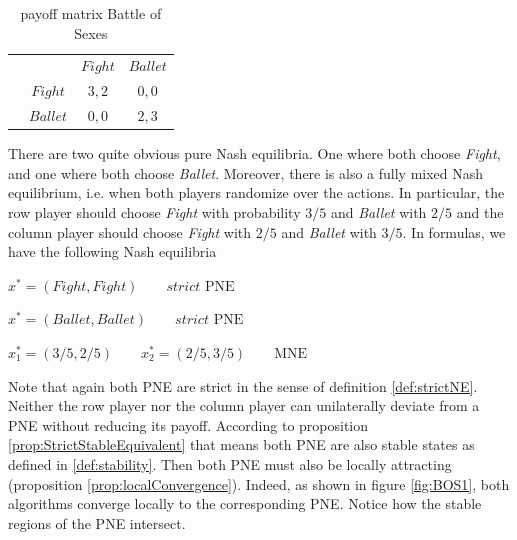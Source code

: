 \begin{table}[H]\centering
\setlength{\extrarowheight}{2pt}
\begin{tabular}{cc|c|c|}
  & \multicolumn{1}{c}{} & \multicolumn{1}{c}{$Fight$}  & \multicolumn{1}{c}{$Ballet$} \\\cline{3-4}
  & $Fight$ & $3,2$ & $0,0$ \\\cline{3-4}
  & $Ballet$ & $0,0$ & $2,3$ \\\cline{3-4}
\end{tabular}\caption{\label{tab:payoffBattleOfSexes}payoff matrix Battle of Sexes}
\end{table}

There are two quite obvious pure Nash equilibria. One where both choose \textit{Fight}, and one where both choose \textit{Ballet}. Moreover, there is also a fully mixed Nash equilibrium, i.e. when both players randomize over the actions. In particular, the row player should choose \textit{Fight} with probability $3/5$ and \textit{Ballet} with $2/5$ and the column player should choose \textit{Fight} with $2/5$ and \textit{Ballet} with $3/5$. In formulas, we have the following Nash equilibria

\begin{description}\centering
    \item $x^{*} = (Fight,Fight) \qquad \textit{strict }\text{PNE}$
    \item $x^{*} = (Ballet,Ballet) \qquad \textit{strict }\text{PNE}$
    \item $x_{1}^* = (3/5,2/5) \qquad x_{2}^* = (2/5,3/5) \qquad \text{MNE}$
\end{description}

Note that again both PNE are strict in the sense of definition \ref{def:strictNE}. Neither the row player nor the column player can unilaterally deviate from a PNE without reducing its payoff. According to proposition \ref{prop:StrictStableEquivalent} that means both PNE are also stable states as defined in \ref{def:stability}. Then both PNE must also be locally attracting (proposition \ref{prop:localConvergence}). Indeed, as shown in figure \ref{fig:BOS1}, both algorithms converge locally to the corresponding PNE. Notice how the stable regions of the PNE intersect.

